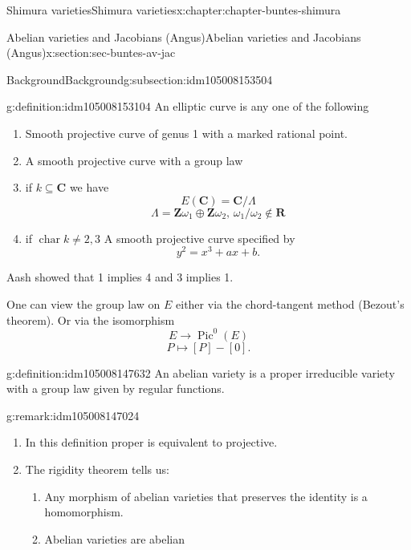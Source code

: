 \documentclass[oneside,10pt,]{book}
\numberwithin{equation}{section}
\newcommand{\ZZ}{\mathbf{Z}}
\newcommand{\RR}{\mathbf{R}}
\newcommand{\CC}{\mathbf{C}}
\DeclareMathOperator{\Pic}{Pic}
\DeclareMathOperator{\characteristic}{char}
\begin{document}
\begin{chapterptx}{Shimura varieties}{}{Shimura varieties}{}{}{x:chapter:chapter-buntes-shimura}
\begin{sectionptx}{Abelian varieties and Jacobians (Angus)}{}{Abelian varieties and Jacobians (Angus)}{}{}{x:section:sec-buntes-av-jac}
\begin{subsectionptx}{Background}{}{Background}{}{}{g:subsection:idm105008153504}
\begin{definition}{}{g:definition:idm105008153104}%
An elliptic curve is any one of the following%
\begin{enumerate}
\item{}Smooth projective curve of genus 1 with  a marked rational point.%
\item{}A smooth projective curve with a group law%
\item{}if \(k \subseteq \CC\) we have%
\begin{equation*}
E(\CC) = \CC/ \Lambda
\end{equation*}
%
\begin{equation*}
\Lambda = \ZZ \omega_1 \oplus \ZZ \omega_2,\, \omega_1/\omega_2 \not\in \RR
\end{equation*}
%
\item{}if \(\characteristic k \ne 2,3\) A smooth projective curve specified by%
\begin{equation*}
y^2=  x^3+ ax + b\text{.}
\end{equation*}
%
\end{enumerate}
%
\end{definition}
Aash showed that 1 implies 4 and 3 implies 1.%
\par
One can view the group law on \(E\) either via the chord-tangent method (Bezout's theorem). Or via the isomorphism%
\begin{equation*}
E \to \Pic^0(E)
\end{equation*}
%
\begin{equation*}
P \mapsto [P] - [0]\text{.}
\end{equation*}
%
\begin{definition}{}{g:definition:idm105008147632}%
An abelian variety is a proper irreducible variety with a group law given by regular functions.%
\end{definition}
\begin{remark}{}{g:remark:idm105008147024}%
%
\begin{enumerate}
\item{}In this definition proper is equivalent to projective.%
\item{}The rigidity theorem tells us:%
\begin{enumerate}
\item{}Any morphism of abelian varieties that preserves the identity is a homomorphism.%
\item{}Abelian varieties are abelian%
\end{enumerate}
%
\end{enumerate}

\end{remark}
\end{subsectionptx}
\end{sectionptx}
\end{chapterptx}
\end{document}
